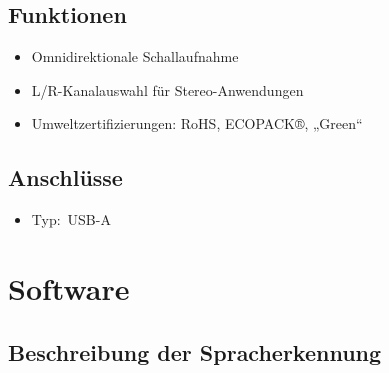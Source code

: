 \section{Funktionen} 

\begin{itemize}
    \item Omnidirektionale Schallaufnahme 
    
    \item L/R-Kanalauswahl für Stereo-Anwendungen 
    
    \item Umweltzertifizierungen: RoHS, ECOPACK®, „Green“
\end{itemize}

\section{Anschlüsse}
\begin{itemize}
    \item Typ: USB-A
\end{itemize}


\chapter{Software} \label{sec:Software}

\section{Beschreibung der Spracherkennung} \label{sec:Beschreibung der Spracherkennung}

